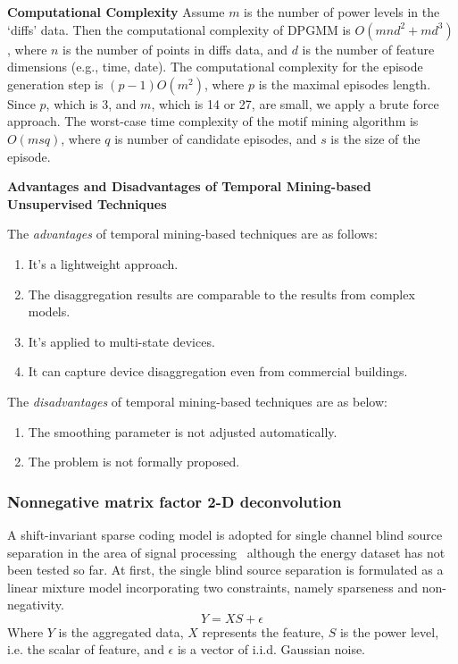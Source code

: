 \textbf{Computational Complexity}
Assume $m$ is
the number of power levels in the `diffs' data. Then the computational complexity of
DPGMM is $O(mnd^2+md^3)$, where $n$ is the number of points in diffs data,
and $d$ is the number of feature dimensions (e.g.,  time, date).
The computational complexity
for the episode generation step is $(p-1)O(m^2)$, where $p$ is the
maximal
episodes length. Since $p$, which is 3, and $m$, which is 14 or 27, are small,
we apply a brute force approach. The worst-case time complexity of the motif
mining algorithm is $O(msq)$, where $q$ is number of candidate episodes, and
$s$ is the size of the episode.

\textbf{Advantages and Disadvantages of Temporal Mining-based Unsupervised Techniques}

The \textit{advantages} of temporal mining-based techniques are as follows:
\begin{enumerate}
\item It's a lightweight approach. 
\item The disaggregation results are comparable to the results from 
complex models. 
\item It's applied to multi-state devices. 
\item It can capture device disaggregation even from commercial buildings. 
\end{enumerate}


The \textit{disadvantages} of temporal mining-based techniques are as below:
\begin{enumerate}
\item The smoothing parameter is not adjusted automatically. 
\item The problem is not formally proposed.  
\end{enumerate}

\iffalse
\subsubsection{Nonnegative matrix factor 2-D deconvolution}
A shift-invariant sparse coding model is adopted for single channel blind source separation 
in the area of signal processing~\cite{blumensath2005shift} although 
the energy dataset has not been tested so far. 
At first, the single blind source separation is formulated as a linear mixture model incorporating 
two constraints, namely sparseness and non-negativity. 
\begin{equation}
Y= XS+\epsilon
\end{equation}
Where $Y$ is the aggregated data, 
$X$ represents the feature, 
$S$ is the power level, i.e. the scalar of feature, 
and $\epsilon$ is a vector of i.i.d. Gaussian noise. 

